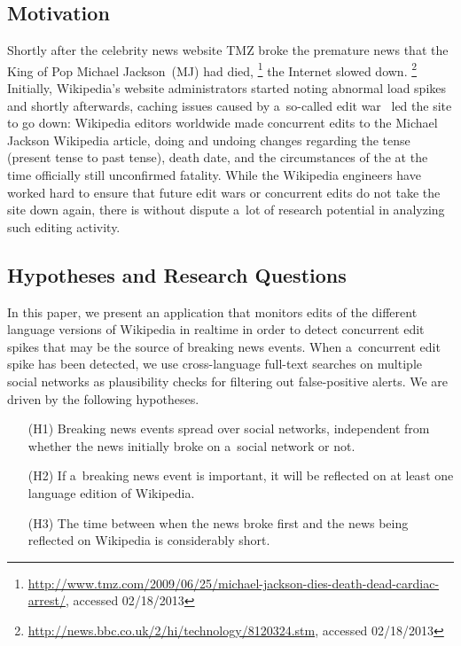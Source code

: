 \documentclass{sig-alternate}
\newcommand{\inlinelistingsize}{\fontsize{8pt}{11pt}}
\let\oldurl\url
\renewcommand{\url}[1]{\inlinelistingsize\oldurl{#1}}
\begin{document}
\subsection{Motivation}

Shortly after the celebrity news website TMZ
broke the premature news that the King of Pop Michael Jackson~(MJ) had died,%
\footnote{\url{http://www.tmz.com/2009/06/25/michael-jackson-dies-death-dead-cardiac-arrest/},
accessed 02/18/2013}
the Internet slowed down.%
\footnote{\url{http://news.bbc.co.uk/2/hi/technology/8120324.stm}, accessed 02/18/2013}
Initially, Wikipedia's website administrators started noting abnormal load spikes~%
\cite{vibber2009currentevents} and shortly afterwards, caching issues
caused by a~so-called edit war~\cite{beaumont2009editwar} led the site to go down:
Wikipedia editors worldwide made concurrent edits
to the Michael Jackson Wikipedia article, doing and undoing changes
regarding the tense (present tense to past tense), death date,
and the circumstances of the at the time officially still unconfirmed fatality.
While the Wikipedia engineers have worked hard
to ensure that future edit wars or concurrent edits
do not take the site down again, there is without dispute a~lot of research potential
in analyzing such editing activity.

\subsection{Hypotheses and Research Questions}

In this paper, we present an application that monitors edits
of the different language versions of Wikipedia in realtime
in order to detect concurrent edit spikes that may be the source of
breaking news events.
When a~concurrent edit spike has been detected,
we use cross-language full-text searches on multiple social networks
as plausibility checks for filtering out false-positive alerts.
We are driven by the following hypotheses.

\begin{itemize}
  \item[(H1)] Breaking news events spread over social networks,
    independent from whether the news initially broke on a~social network or not.
  \item[(H2)] If a~breaking news event is important, it will be reflected on
    at least one language edition of Wikipedia.
  \item[(H3)] The time between when the news broke first and the news
    being reflected on Wikipedia is considerably short.   
\end{itemize}
\end{document}
